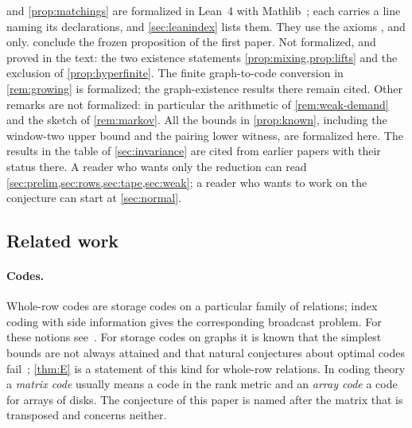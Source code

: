 and \cref{prop:matchings} are formalized in
Lean~4 with Mathlib~\cite{Mathlib2026}; each carries a line naming its declarations, and \cref{sec:leanindex} lists
them. They use the axioms ,  and  only. 
conclude the frozen proposition of the first paper. Not formalized, and proved in the text: the two existence statements
\cref{prop:mixing,prop:lifts} and the exclusion of \cref{prop:hyperfinite}.
The finite graph-to-code conversion in \cref{rem:growing} is formalized; the graph-existence results there remain
cited. Other remarks are not formalized: in particular the arithmetic of \cref{rem:weak-demand} and the sketch of
\cref{rem:markov}. All the bounds in \cref{prop:known}, including the window-two upper bound and the pairing
lower witness, are formalized here. The results in the table of \cref{sec:invariance} are cited from earlier papers
with their status there. A
reader who wants only the reduction can read \cref{sec:prelim,sec:rows,sec:tape,sec:weak}; a reader who wants to work
on the conjecture can start at \cref{sec:normal}.

\subsection{Related work}\label{sec:intro-related}

\paragraph{Codes.} Whole-row codes are storage codes on a particular family of relations; index coding with
side information gives the corresponding broadcast problem. For these notions see~\cite{BBJK2011,Riis2007}.
For storage codes on graphs it is
known that the simplest bounds are not always attained and that natural conjectures about optimal codes
fail~\cite{ChristofidesMarkstrom2011,Baber2017}; \cref{thm:E} is a statement of this kind for whole-row relations. In
coding theory a \emph{matrix code} usually means a code in the rank metric and an \emph{array code} a code for
arrays of disks. The conjecture of this paper is named after the matrix that is transposed and concerns neither.

